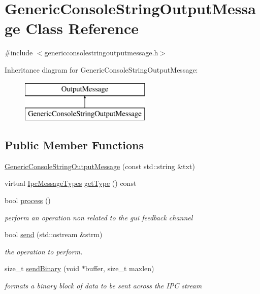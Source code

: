 \hypertarget{class_generic_console_string_output_message}{}\section{Generic\+Console\+String\+Output\+Message Class Reference}
\label{class_generic_console_string_output_message}


{\ttfamily \#include $<$genericconsolestringoutputmessage.\+h$>$}

Inheritance diagram for Generic\+Console\+String\+Output\+Message\+:\begin{figure}[H]
\begin{center}
\leavevmode
\includegraphics[height=2.000000cm]{d9/da5/class_generic_console_string_output_message}
\end{center}
\end{figure}
\subsection*{Public Member Functions}
\begin{DoxyCompactItemize}
\item 
\mbox{\hyperlink{class_generic_console_string_output_message_ad8b27be4c6fe9d5ee3dedf51f274a171}{Generic\+Console\+String\+Output\+Message}} (const std\+::string \&txt)
\item 
virtual \mbox{\hyperlink{ipcmsgtypes_8h_a59f75a61492e64aebfae0cc49cc26683}{Ipc\+Message\+Types}} \mbox{\hyperlink{class_generic_console_string_output_message_a80cb535bea64b33a076b6207356a7c3c}{get\+Type}} () const
\item 
bool \mbox{\hyperlink{class_generic_console_string_output_message_a89a8f1a84f56aac8d98984d552095155}{process}} ()
\begin{DoxyCompactList}\small\item\em perform an operation non related to the gui feedback channel \end{DoxyCompactList}\item 
bool \mbox{\hyperlink{class_generic_console_string_output_message_afd9c18543844626cb07d800e9f8b43a6}{send}} (std\+::ostream \&strm)
\begin{DoxyCompactList}\small\item\em the operation to perform. \end{DoxyCompactList}\item 
size\+\_\+t \mbox{\hyperlink{class_generic_console_string_output_message_abc038d7b5db3a2b2835ea23ad35d77e9}{send\+Binary}} (void $\ast$buffer, size\+\_\+t maxlen)
\begin{DoxyCompactList}\small\item\em formats a binary block of data to be sent across the I\+PC stream \end{DoxyCompactList}\end{DoxyCompactItemize}


